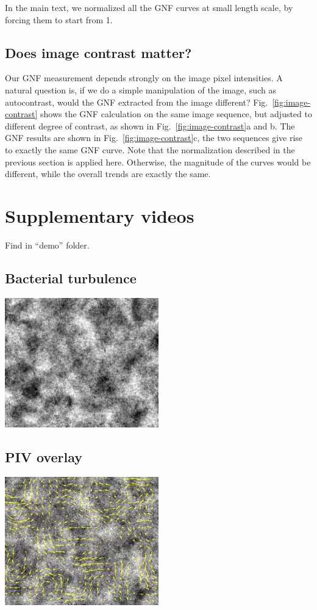 \documentclass[preprint,aps,prl,amsmath,amssymb,longbibliography]{revtex4-2}
\begin{document}
In the main text, we normalized all the GNF curves at small length scale, by forcing them to start from 1.



\subsection{Does image contrast matter?}

Our GNF measurement depends strongly on the image pixel intensities. A natural question is, if we do a simple manipulation of the image, such as autocontrast, would the GNF extracted from the image different? Fig.~\ref{fig:image-contrast} shows the GNF calculation on the same image sequence, but adjusted to different degree of contrast, as shown in Fig.~\ref{fig:image-contrast}a and b. The GNF results are shown in Fig.~\ref{fig:image-contrast}c, the two sequences give rise to exactly the same GNF curve. Note that the normalization described in the previous section is applied here. Otherwise, the magnitude of the curves would be different, while the overall trends are exactly the same.


\newpage

\section{Supplementary videos}
Find in ``demo'' folder.
\subsection{Bacterial turbulence}
\includegraphics[width=0.5\textwidth]{Figures/video-snapshot/t.jpg}
\subsection{PIV overlay}
\includegraphics[width=0.5\textwidth]{Figures/video-snapshot/piv.jpg}



\end{document}
